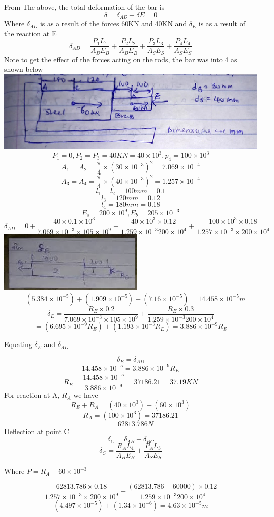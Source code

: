 \documentclass{article}
\begin{document}
From The above, the total deformation of the bar is
\[\delta =\delta_{AD} + \delta{E} = 0\]
Where $\delta_{AD}$ is as a result of the forces 60KN and 40KN
and $\delta_{E}$ is as a result of the reaction at E
\[\delta_{AD} = \frac{P_{1}L_{1}}{A_{B}E_{B}} + \frac{P_{2}L_{2}}{A_{B}E_{B}} + \frac{P_{3}L_{3}}{A_{S}E_{S}} + \frac{P_{4}L_{4}}{A_{S}E_{S}} \]
Note to get the effect of the forces acting on the rods, the bar was into 4 as shown below
\includegraphics{7}
\[P_{1} = 0, P_{2}=P_{3}=40KN= 40\times10^{3}, p_{4}=100\times10^{3}\]
\[A_{1} = A_{2} = \frac{\pi}{4}\times(30\times10^{-3})^{2}=7.069\times10^{-4}\]
\[A_{3} = A_{4} = \frac{\pi}{4}\times(40\times10^{-3})^{2}=1.257\times10^{-4}\]
\[l_{1} = l_{2} = 100mm = 0.1\]
\[l_{3} = 120mm = 0.12\]
\[l_{4} = 180mm = 0.18\]
\[E_{s} = 200\times 10^{9}, E_{b} = 205\times10^{-3}\]
\[\delta_{AD} = 0 + \frac{40\times0.1\times10^{3}}{7.069\times10^{-3}\times105\times10^{9}}+\frac{40\times10^{3}\times0.12}{1.259\times10^{-3}200\times10^{4}} + \frac{100\times10^{3}\times0.18}{1.257\times10^{-3}\times200\times10^{4}}\]
\includegraphics{IMG-20220127-WA0007}
\[=(5.384\times10^{-5}) + (1.909\times10^{-5}) + (7.16\times10^{-5}) = 14.458\times10^{-5}m\]
\[\delta_{E} = \frac{R_{E}\times 0.2}{7.069\times10^{-3}\times105\times10^{9}}+\frac{R_{E}\times0.3}{1.259\times10^{-3}200\times10^{4}}\]
\[=(6.695\times10^{-9}R_{E}) + (1.193\times10^{-3}R_{E}) = 3.886\times10^{-9}R_{E}\]
\begin{center} Equating $\delta_{E}$ and $\delta_{AD}$\end{center}
\[\delta_{E}= \delta_{AD}\]
\[ 14.458\times10^{-5}=3.886\times10^{-9}R_{E}\]
\[R_{E} = \frac{14.458\times10^{-5}}{3.886\times10^{-9}} = 37186.21 = 37.19KN\]
For reaction at A, $R_{A}$ we have
\[R_{E}+R_{A} = (40\times10^{3})+(60\times10^{3})\]
\[R_{A} = (100\times10^{3})=37186.21\]
\[=62813.786N\]
Deflection at point C
\[\delta_{C} = \delta_{AB} + \delta_{BC}\]
\[\delta_{C} = \frac{R_{A}L_{4}}{A_{B}E_{B}} + \frac{P_{A}L_{3}}{A_{S}E_{S}}\]
\begin{center} Where $P = R_{A} - 60\times10^{-3}$\end{center}
\[\frac{62813.786 \times 0.18}{1.257\times 10^{-3}\times 200\times 10^{9}}+\frac{(62813.786-60000)\times 0.12}{1.259\times10^{-3}200\times10^{4}}\]
\[(4.497\times10^{-5})+(1.34\times10^{-6})=4.63\times10^{-5}m\]
\end{document}
